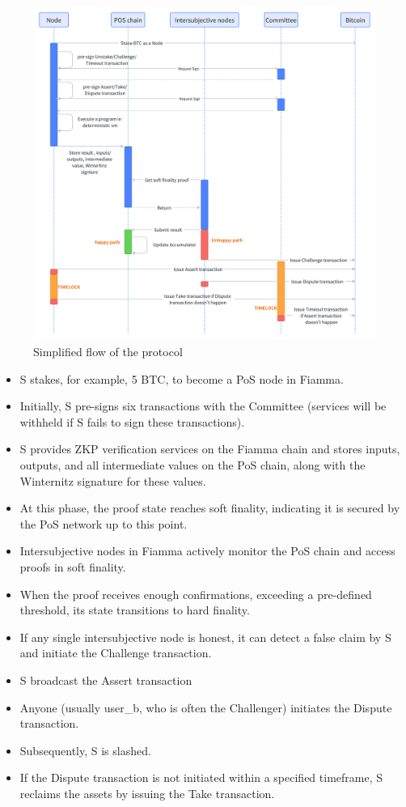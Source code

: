 \begin{figure}[ht] 
    \centering  
    \includegraphics[width=0.85\columnwidth]{images/bitvm2 simple flow.png} 
    \caption{Simplified flow of the protocol}
    \label{fig:bitvm2 simple flow}
\end{figure}

\begin{itemize}
    \item S stakes, for example, 5 BTC, to become a PoS node in Fiamma.
    \item Initially, S pre-signs six transactions with the Committee (services will be withheld if S fails to sign these transactions).
    \item S provides ZKP verification services on the Fiamma chain and stores inputs, outputs, and all intermediate values on the PoS chain, along with the Winternitz signature for these values.
    \item At this phase, the proof state reaches soft finality, indicating it is secured by the PoS network up to this point.
    \item Intersubjective nodes in Fiamma actively monitor the PoS chain and access proofs in soft finality.
    \item When the proof receives enough confirmations, exceeding a pre-defined threshold, its state transitions to hard finality.
    \item If any single intersubjective node is honest, it can detect a false claim by S and initiate the Challenge transaction.
    \item S broadcast the Assert transaction
    \item Anyone (usually user\_b, who is often the Challenger) initiates the Dispute transaction.
    \item Subsequently, S is slashed.
    \item If the Dispute transaction is not initiated within a specified timeframe, S reclaims the assets by issuing the Take transaction.
\end{itemize}

